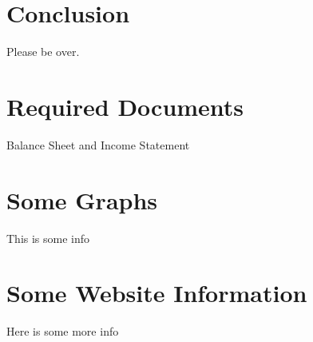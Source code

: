 \documentclass[12pt,a4paper,titlepage]{article}
\begin{document}
\section{Conclusion}
Please be over.

\section{Required Documents}
Balance Sheet and Income Statement

\newpage

\appendix

\section{Some Graphs}
This is some info

\section{Some Website Information}
Here is some more info

\newpage

\end{document}
